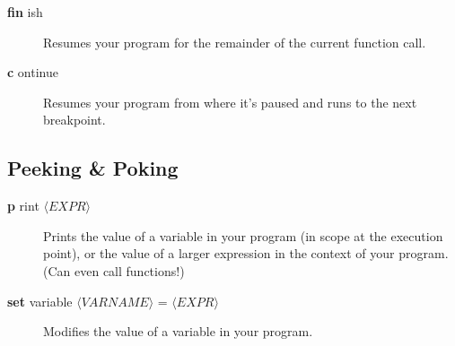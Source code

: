 \documentclass[11pt]{article}
\newcommand\dbc[2]{{%
  \sffamily\upshape\mdseries
  \textbf{\textcolor{Abbreviation} {#1}}%
  #2}}
\newcommand\abw[1]{$\langle\mathit{#1}\rangle$}
\begin{document}
\begin{multicols}{2}
\begin{description}
  \item[\dbc{fin}{ish}] Resumes your program for the remainder of the
    current function call.

  \item[\dbc{c}{ontinue}] Resumes your program from where it’s paused
    and runs to the next breakpoint.

\end{description}

\subsection*{Peeking \& Poking}
\begin{description}

  \item[\dbc{p}{rint} \abw{EXPR}] Prints the value of a variable in your
    program (in scope at the execution point), or the value of a larger
    expression in the context of your program. (Can even call
    functions!)

  \item[\dbc{set}{ variable} \abw{VARNAME} = \abw{EXPR}] Modifies the
    value of a variable in your program.

\end{description}

\end{multicols}
\end{document}
